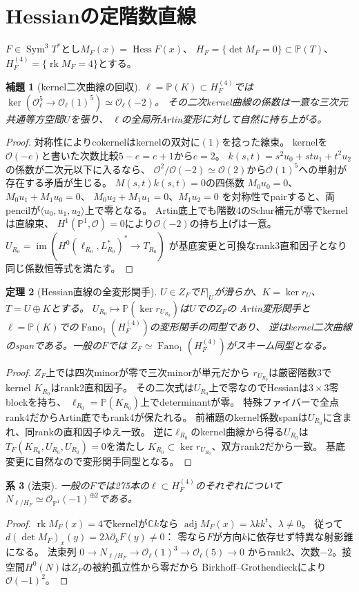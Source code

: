 \documentclass[11pt,a4paper]{ltjsarticle}
\newtheorem{theorem}{定理}[section]
\newtheorem{lemma}[theorem]{補題}
\newtheorem{corollary}[theorem]{系}
\newcommand{\CC}{\mathbb C}
\newcommand{\PP}{\mathbb P}
\newcommand{\OO}{\mathcal O}
\newcommand{\Sym}{\operatorname{Sym}}
\begin{document}
\section{Hessianの定階数直線}
$F\in\Sym^3T^*$とし$M_F(x)=\operatorname{Hess}F(x)$、
$H_F=\{\det M_F=0\}\subset\PP(T)$、$H_F^{(4)}=\{\operatorname{rk}M_F=4\}$とする。
\begin{lemma}[kernel二次曲線の回収]\label{lem:kernel}
$\ell=\PP(K)\subset H_F^{(4)}$では
$\ker(\OO_\ell^5\to\OO_\ell(1)^5)\simeq\OO_\ell(-2)$。
その二次kernel曲線の係数は一意な三次元共通等方空間$U$を張り、
$\ell$の全局所Artin変形に対して自然に持ち上がる。
\end{lemma}
\begin{proof}
対称性によりcokernelはkernelの双対に$(1)$を捻った線束。
kernelを$\OO(-e)$と書いた次数比較$5-e=e+1$から$e=2$。
$k(s,t)=s^2u_0+stu_1+t^2u_2$の係数が二次元以下に入るなら、
$\OO^2/\OO(-2)\simeq\OO(2)$から$\OO(1)^5$への単射が存在する矛盾が生じる。
$M(s,t)k(s,t)=0$の四係数
$M_0u_0=0$、$M_0u_1+M_1u_0=0$、
$M_0u_2+M_1u_1=0$、$M_1u_2=0$
を対称性でpairすると、両pencilが$\langle u_0,u_1,u_2\rangle$上で零となる。
Artin底上でも階数4のSchur補元が零でkernelは直線束、
$H^1(\PP^1,\OO)=0$により$\OO(-2)$の持ち上げは一意。
$U_{R_0}=\operatorname{im}(H^0(\ell_{R_0},L_{R_0}^*)^*\to T_{R_0})$
が基底変更と可換なrank3直和因子となり同じ係数恒等式を満たす。
\end{proof}
\begin{theorem}[Hessian直線の全変形関手]
$U\in Z_F$で$F|_U$が滑らか、$K=\ker r_U$、$T=U\oplus K$とする。
$U_{R_0}\mapsto\PP(\ker r_{U_{R_0}})$は$U$での$Z_F$の
Artin変形関手と$\ell=\PP(K)$での$\operatorname{Fano}_1(H_F^{(4)})$の変形関手の同型であり、
逆はkernel二次曲線のspanである。一般の$F$では
$Z_F\simeq\operatorname{Fano}_1(H_F^{(4)})$がスキーム同型となる。
\end{theorem}
\begin{proof}
$Z_F$上では四次minorが零で三次minorが単元だから
$r_{U_{R_0}}$は厳密階数3でkernel $K_{R_0}$はrank2直和因子。
その二次式は$U_{R_0}$上で零なのでHessianは$3\times3$零blockを持ち、
$\ell_{R_0}=\PP(K_{R_0})$上でdeterminantが零。
特殊ファイバーで全点rank4だからArtin底でもrank4が保たれる。
前補題のkernel係数spanは$U_{R_0}$に含まれ、同rankの直和因子ゆえ一致。
逆に$\ell_{R_0}$のkernel曲線から得る$U_{R_0}$は
$T_F(K_{R_0},U_{R_0},U_{R_0})=0$を満たし
$K_{R_0}\subset\ker r_{U_{R_0}}$、双方rank2だから一致。
基底変更に自然なので変形関手同型となる。
\end{proof}
\begin{corollary}[法束]
一般の$F$では275本の$\ell\subset H_F^{(4)}$のそれぞれについて
$N_{\ell/H_F}\simeq\OO_{\PP^1}(-1)^{\oplus2}$である。
\end{corollary}
\begin{proof}
$\operatorname{rk}M_F(x)=4$でkernelが$\CC k$なら
$\operatorname{adj}M_F(x)=\lambda kk^{\mathsf t}$、$\lambda\ne0$。
従って$d(\det M_F)_x(y)=2\lambda\partial_kF(y)\ne0$：
零なら$F$が方向$k$に依存せず特異な射影錐になる。
法束列
$0\to N_{\ell/H_F}\to\OO_\ell(1)^3\to\OO_\ell(5)\to0$
からrank2、次数$-2$。接空間$H^0(N)$は$Z_F$の被約孤立性から零だから
Birkhoff--Grothendieckにより$\OO(-1)^2$。
\end{proof}
\end{document}
